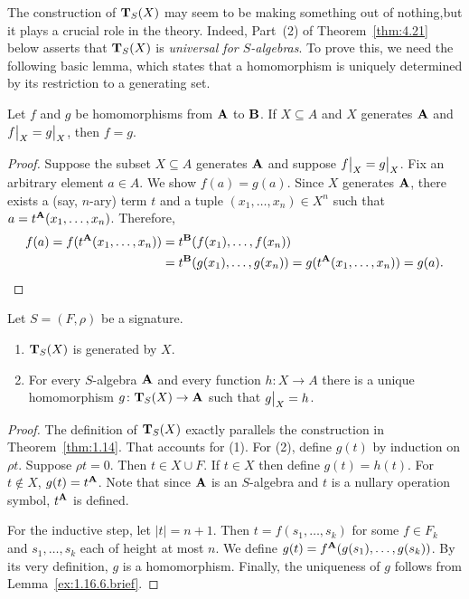 \documentclass[11pt]{amsart}  %
\begin{document}
The construction of $\mathbf{T}_S(X)$ may seem to be making something out of nothing,but it plays a crucial role in the theory. Indeed, Part~(2) of Theorem~\ref{thm:4.21} below asserts that $\mathbf{T}_S(X)$ is \emph{universal for $S$-algebras}.  To prove this, we need the following basic lemma, which states that a homomorphism is uniquely determined by its restriction to a generating set. 
\begin{lemma}
  \label{ex:1.16.6.brief} 
  Let $f$ and $g$ be homomorphisms from $\mathbf{A}$ to $\mathbf{B}$.
If $X \subseteq A$ and $X$ generates $\mathbf{A}$ and
    $\restr{f}{X} = \restr{g}{X}$, then $f = g$. 
\end{lemma}
\begin{proof}
  Suppose the subset $X \subseteq A$ generates $\mathbf{A}$ and suppose
  $\restr{f}{X} = \restr{g}{X}$.
  Fix an arbitrary element $a\in A$.  We show $f(a) = g(a)$.
  Since $X$ generates $\mathbf{A}$, there exists a (say, $n$-ary) term $t$ and 
  a tuple $(x_1, \dots, x_n) \in X^n$ such that 
  $a = t^{\mathbf{A}}(x_1, \dots, x_n)$. Therefore, 
  \begin{align*}
    f(a) = f(t^{\mathbf{A}}(x_1, \dots, x_n)) &= t^{\mathbf{B}}(f(x_1), \dots, f(x_n))\\
                                    &= t^{\mathbf{B}}(g(x_1), \dots, g(x_n))
                                     = g(t^{\mathbf{A}}(x_1, \dots, x_n)) = g(a).
  \end{align*}
\end{proof}

\begin{theorem} 
  \label{thm:4.21}
  Let $S = (F, \rho)$ be a signature.
  \begin{enumerate}
    \item $\mathbf{T}_S(X)$ is generated by $X$.
    \item For every $S$-algebra $\mathbf{A}$ and every function 
    $h\colon X \to A$ there is a unique homomorphism $g\colon \mathbf{T}_S(X) \to \mathbf{A}$ 
    such that $\restr{g}{X} = h$.
  \end{enumerate}
\end{theorem}
\begin{proof} The definition of $\mathbf{T}_S(X)$ exactly parallels the construction in Theorem~\ref{thm:1.14}. That accounts for (1). For (2), define $g(t)$ by induction on $\rho t$. Suppose $\rho t = 0$. Then $t \in X \cup F$. If $t \in X$ then define $g(t) = h(t)$. For $t \notin X$, $g(t) = t^{\mathbf{A}}$. 
Note that since $\mathbf{A}$ is an $S$-algebra and $t$ is a nullary operation symbol, $t^{\mathbf{A}}$ is defined.

For the inductive step, let $|t| = n + 1$. Then $t = f(s_1, \dots, s_k)$ for some $f \in F_k$ and $s_1, \dots, s_k$ each of height at most $n$. We define
$g(t) = f^{\mathbf{A}}(g(s_1), \dots, g(s_k))$.
By its very definition, $g$ is a homomorphism.
Finally, the uniqueness of $g$ follows from Lemma~\ref{ex:1.16.6.brief}. 
\end{proof}
\end{document}
